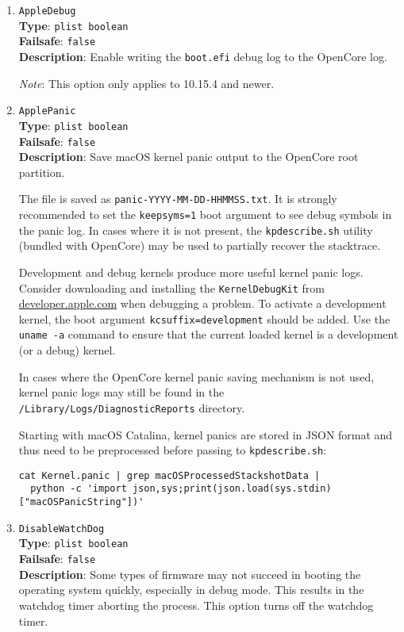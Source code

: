 \documentclass[]{article}
\begin{document}
\begin{enumerate}

\item
  \texttt{AppleDebug}\\
  \textbf{Type}: \texttt{plist\ boolean}\\
  \textbf{Failsafe}: \texttt{false}\\
  \textbf{Description}: Enable writing the \texttt{boot.efi} debug log to the OpenCore log.

  \emph{Note}: This option only applies to 10.15.4 and newer.

\item
  \texttt{ApplePanic}\\
  \textbf{Type}: \texttt{plist\ boolean}\\
  \textbf{Failsafe}: \texttt{false}\\
  \textbf{Description}: Save macOS kernel panic output to the OpenCore root partition.

  The file is saved as \texttt{panic-YYYY-MM-DD-HHMMSS.txt}. It is strongly
  recommended to set the \texttt{keepsyms=1} boot argument to see debug symbols
  in the panic log. In cases where it is not present, the \texttt{kpdescribe.sh}
  utility (bundled with OpenCore) may be used to partially recover the stacktrace.

  Development and debug kernels produce more useful kernel panic logs.
  Consider downloading and installing the \texttt{KernelDebugKit} from
  \href{https://developer.apple.com}{developer.apple.com} when debugging a problem.
  To activate a development kernel, the boot argument \texttt{kcsuffix=development} should be added.
  Use the \texttt{uname -a} command to ensure that the current loaded
  kernel is a development (or a debug) kernel.

  In cases where the OpenCore kernel panic saving mechanism is not used, kernel panic
  logs may still be found in the \texttt{/Library/Logs/DiagnosticReports} directory.

  Starting with macOS Catalina, kernel panics are stored in JSON format and thus
  need to be preprocessed before passing to \texttt{kpdescribe.sh}:

\begin{lstlisting}[label=kpanic, style=ocbash]
cat Kernel.panic | grep macOSProcessedStackshotData |
  python -c 'import json,sys;print(json.load(sys.stdin)["macOSPanicString"])'
\end{lstlisting}

\item
  \texttt{DisableWatchDog}\\
  \textbf{Type}: \texttt{plist\ boolean}\\
  \textbf{Failsafe}: \texttt{false}\\
  \textbf{Description}: Some types of firmware may not succeed in booting
  the operating system quickly, especially in debug mode. This results in the
  watchdog timer aborting the process. This option turns off the watchdog timer.


\end{enumerate}
\end{document}
